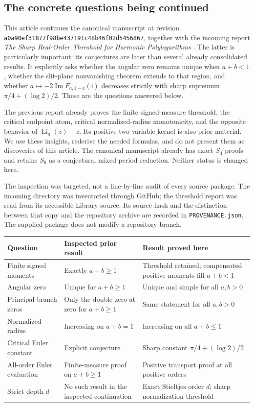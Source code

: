 \documentclass[11pt]{article}
\numberwithin{equation}{section}
\theoremstyle{definition}
\theoremstyle{remark}
\DeclareMathOperator{\Li}{Li}
\DeclareMathOperator{\Impart}{Im}
\newcommand{\ii}{\mathrm i}
\newcommand{\basecommit}{\nolinkurl{a0a90ef31877f98be437191c48b46f02d5456867}}
\begin{document}
\subsection{The concrete questions being continued}
This article continues the canonical manuscript \cite{repo} at revision
\basecommit, together with the incoming report
\emph{The Sharp Real-Order Threshold for Harmonic Polylogarithms}
\cite{threshold}. The latter is particularly important: its conjectures
are later than several already consolidated results. It explicitly asks
whether the angular zero remains unique when $a+b<1$, whether the
slit-plane nonvanishing theorem extends to that region, and whether
$a\mapsto-2\Impart F_{a,1-a}(\ii)$ decreases strictly with sharp supremum
$\pi/4+(\log2)/2$. These are the questions answered below.

The previous report already proves the finite signed-measure threshold,
the critical endpoint atom, critical normalized-radius monotonicity,
and the opposite behavior of $\Li_a(z)-z$. Its positive two-variable
kernel is also prior material. We use these insights, rederive the needed
formulas, and do not present them as discoveries of this article.
The canonical manuscript already has exact $S_4$ proofs and retains $S_6$
as a conjectural mixed period reduction. Neither status is changed here.

The inspection was targeted, not a line-by-line audit of every source
package. The incoming directory was inventoried through GitHub; the
threshold report was read from its accessible Library source. Its source
hash and the distinction between that copy and the repository archive
are recorded in \texttt{PROVENANCE.json}. The supplied package does not
modify a repository branch.

\begin{center}
\small
\begin{tabular}{@{}p{.25\linewidth}p{.31\linewidth}p{.35\linewidth}@{}}
\toprule
Question & Inspected prior result & Result proved here\\
\midrule
Finite signed moments & Exactly $a+b\ge1$ & Threshold retained; compensated positive moments fill $a+b<1$\\
Angular zero & Unique for $a+b\ge1$ & Unique and simple for all $a,b>0$\\
Principal-branch zeros & Only the double zero at zero for $a+b\ge1$ & Same statement for all $a,b>0$\\
Normalized radius & Increasing on $a+b=1$ & Increasing on all $a+b\le1$\\
Critical Euler constant & Explicit conjecture & Sharp constant $\pi/4+(\log2)/2$\\
All-order Euler evaluation & Finite-measure proof on $a+b\ge1$ & Positive transport proof at all positive orders\\
Strict depth $d$ & No such result in the inspected continuation & Exact Stieltjes order $d$; sharp normalization threshold\\
\bottomrule
\end{tabular}
\end{center}
\end{document}
